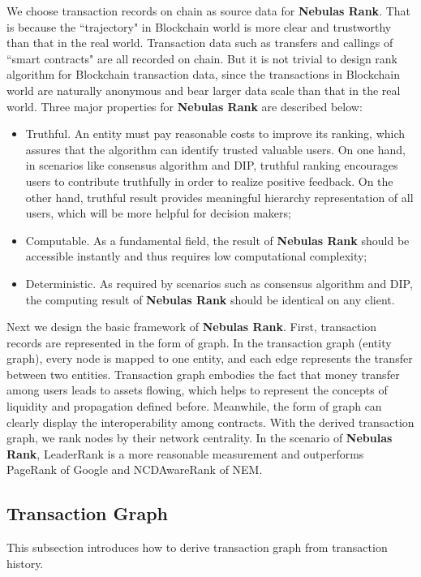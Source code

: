 We choose transaction records on chain as source data for \textbf{Nebulas Rank}. That is because the ``trajectory" in Blockchain world is more clear and trustworthy than that in the real world. Transaction data such as transfers and callings of ``smart contracts" are all recorded on chain. But it is not trivial to design rank algorithm for Blockchain transaction data, since the transactions in Blockchain world are naturally anonymous and bear larger data scale than that in the real world. Three major properties for \textbf{Nebulas Rank} are described below:
\begin{itemize}
	\item Truthful. An entity must pay reasonable costs to improve its ranking, which assures that the algorithm can identify trusted valuable users. On one hand, in scenarios like consensus algorithm and DIP, truthful ranking encourages users to contribute truthfully in order to realize positive feedback. On the other hand, truthful result provides meaningful hierarchy representation of all users, which will be more helpful for decision makers;
	\item Computable. As a fundamental field, the result of \textbf{Nebulas Rank} should be accessible instantly and thus requires low computational complexity;
	\item Deterministic. As required by scenarios such as consensus algorithm and DIP, the computing result of \textbf{Nebulas Rank} should be identical on any client.
\end{itemize}

Next we design the basic framework of \textbf{Nebulas Rank}. First, transaction records are represented in the form of graph. In the transaction graph (entity graph), every node is mapped to one entity, and each edge represents the transfer between two entities\cite{Tschorsch2015}. Transaction graph embodies the fact that money transfer among users leads to assets flowing, which helps to represent the concepts of liquidity and propagation defined before. Meanwhile, the form of graph can clearly display the interoperability among contracts. With the derived transaction graph, we rank nodes by their network centrality. In the scenario of \textbf{Nebulas Rank}, LeaderRank\cite{Chen2013}\cite{Li2014} is a more reasonable measurement and outperforms PageRank of Google and NCDAwareRank of NEM\cite{nem}.

\subsection{Transaction Graph} \label{subsec:txg}
This subsection introduces how to derive transaction graph from transaction history.

